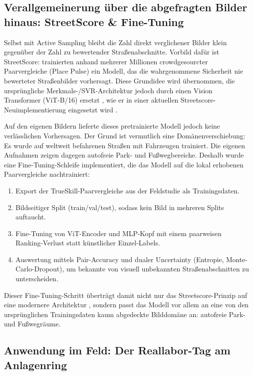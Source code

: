 \documentclass[a4paper,12pt]{article}
\begin{document}
\subsection{Verallgemeinerung über die abgefragten Bilder hinaus: StreetScore \& Fine-Tuning}

Selbst mit Active Sampling bleibt die Zahl direkt verglichener Bilder klein gegenüber der Zahl zu bewertender Straßenabschnitte. Vorbild dafür ist StreetScore: \textcite{naik2014} trainierten anhand mehrerer Millionen crowdgesourcter Paarvergleiche (Place Pulse) ein Modell, das die wahrgenommene Sicherheit nie bewerteter Straßenbilder vorhersagt. Diese Grundidee wird übernommen, die ursprüngliche Merkmals-/SVR-Architektur jedoch durch einen Vision Transformer (ViT-B/16) ersetzt \autocite{dosovitskiy2021}, wie er in einer aktuellen Streetscore-Neuimplementierung eingesetzt wird \autocite{hou2024}.

Auf den eigenen Bildern lieferte dieses pretrainierte Modell jedoch keine verlässlichen Vorhersagen. Der Grund ist vermutlich eine Domänenverschiebung: Es wurde auf weltweit befahrenen Straßen mit Fahrzeugen trainiert. Die eigenen Aufnahmen zeigen dagegen autofreie Park- und Fußwegbereiche. Deshalb wurde eine Fine-Tuning-Schleife implementiert, die das Modell auf die lokal erhobenen Paarvergleiche nachtrainiert:

\begin{enumerate}
	\item Export der TrueSkill-Paarvergleiche aus der Feldstudie als Trainingsdaten.
	\item Bildseitiger Split (train/val/test), sodass kein Bild in mehreren Splits auftaucht.
	\item Fine-Tuning von ViT-Encoder und MLP-Kopf mit einem paarweisen Ranking-Verlust statt künstlicher Einzel-Labels.
	\item Auswertung mittels Pair-Accuracy und dualer Uncertainty (Entropie, Monte-Carlo-Dropout), um bekannte von visuell unbekannten Straßenabschnitten zu unterscheiden.
\end{enumerate}

Dieser Fine-Tuning-Schritt überträgt damit nicht nur das Streetscore-Prinzip auf eine modernere Architektur \autocite{hou2024}, sondern passt das Modell vor allem an eine von den ursprünglichen Trainingsdaten kaum abgedeckte Bilddomäne an: autofreie Park- und Fußwegräume.

\subsection{Anwendung im Feld: Der Reallabor-Tag am Anlagenring}
\end{document}
